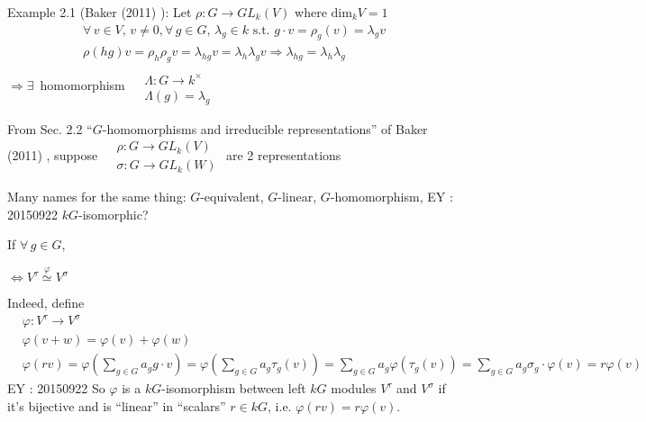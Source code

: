\documentclass[10pt]{amsart}
\begin{document}
\begin{multicols*}{2}
Example 2.1 (Baker (2011) \cite{ABaker2011}): Let $\rho :G \to GL_k(V)$ where $\text{dim}_kV=1$
\[
\begin{gathered}
  \forall \, v \in V, \, v\neq 0 , \forall \, g \in G, \, \lambda_g \in k \text{ s.t. } g \cdot v = \rho_g(v) = \lambda_g v \\ 
  \rho(hg) v = \rho_h \rho_g v = \lambda_{hg} v = \lambda_h \lambda_g v \Longrightarrow \lambda_{hg} = \lambda_h \lambda_g
\end{gathered}
\]
$\Longrightarrow \exists \, $ homomorphism $\begin{aligned} & \quad \\
  & \Lambda : G \to k^{\times } \\
  & \Lambda(g) = \lambda_g \end{aligned}$


From Sec. 2.2 ``$G$-homomorphisms and irreducible representations'' of Baker (2011) \cite{ABaker2011}, suppose $\begin{aligned} & \rho : G \to GL_k(V) \\
  & \sigma : G \to GL_k(W) \end{aligned}$ are 2 representations

Many names for the same thing: $G$-equivalent, $G$-linear, $G$-homomorphism, EY : 20150922 $kG$-isomorphic?

If $\forall \, g \in G$, 

  $\Longleftrightarrow  V^{\tau} \overset{\varphi}{\simeq} V^{\sigma}$

Indeed, define 
\[
\begin{aligned}
  & \varphi: V^{\tau} \to V^{\sigma} \\ 
  & \varphi(v+w) = \varphi(v) + \varphi(w) \\ 
  & \varphi(rv) = \varphi( \sum_{g\in G} a_g g \cdot v) = \varphi( \sum_{g \in G} a_g \tau_g(v) ) = \sum_{ g\in G} a_g \varphi(\tau_g(v)) = \sum_{g\in G} a_g \sigma_g \cdot \varphi(v) = r\varphi(v)
\end{aligned}
\]
EY : 20150922 So $\varphi$ is a $kG$-isomorphism between left $kG$ modules $V^{\tau}$ and $V^{\sigma}$ if it's bijective and is ``linear'' in ``scalars'' $r\in kG$, i.e. $\varphi(rv) = r\varphi(v)$.  


\end{multicols*}
\end{document}
